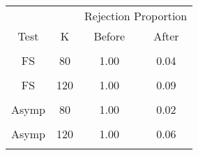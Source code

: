 \begin{table}[!h]
\centering
\begin{tabular}{cccc}
\toprule
\multicolumn{1}{c}{ } & \multicolumn{1}{c}{ } & \multicolumn{2}{c}{Rejection Proportion} \\
\cmidrule(l{3pt}r{3pt}){3-4}
Test & K & Before & After\\
\midrule
\cellcolor{gray!6}{FS} & \cellcolor{gray!6}{60} & \cellcolor{gray!6}{1.00} & \cellcolor{gray!6}{0.02}\\
FS & 80 & 1.00 & 0.04\\
\cellcolor{gray!6}{FS} & \cellcolor{gray!6}{100} & \cellcolor{gray!6}{1.00} & \cellcolor{gray!6}{0.05}\\
FS & 120 & 1.00 & 0.09\\
\cellcolor{gray!6}{Asymp} & \cellcolor{gray!6}{60} & \cellcolor{gray!6}{1.00} & \cellcolor{gray!6}{0.03}\\
\addlinespace
Asymp & 80 & 1.00 & 0.02\\
\cellcolor{gray!6}{Asymp} & \cellcolor{gray!6}{100} & \cellcolor{gray!6}{1.00} & \cellcolor{gray!6}{0.06}\\
Asymp & 120 & 1.00 & 0.06\\
\cellcolor{gray!6}{ECE} & \cellcolor{gray!6}{} & \cellcolor{gray!6}{0.23} & \cellcolor{gray!6}{0.14}\\
\bottomrule
\end{tabular}
\end{table}
